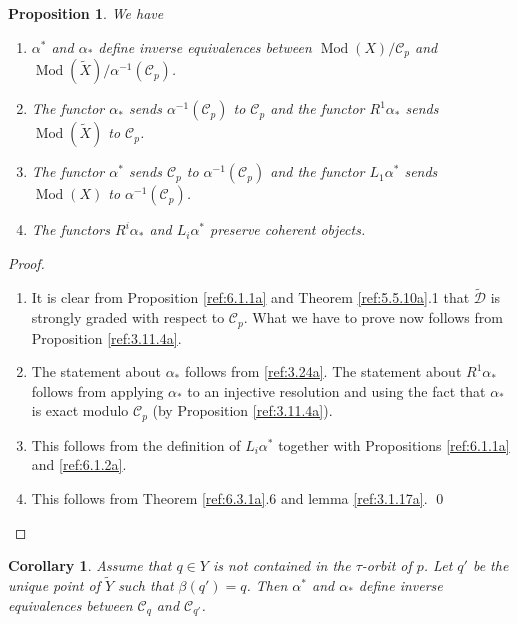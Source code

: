 \documentclass{amsproc}
\def\Cscr{{\mathcal C}}
\def\Dscr{{\mathcal D}}
\def\Qch{\operatorname {Mod}}
\newtheorem{propositions}[lemmas]{Proposition}
\newtheorem{corollarys}[lemmas]{Corollary}
\theoremstyle{definition}
\theoremstyle{remark}
\numberwithin{equation}{section}
\numberwithin{table}{section}
\numberwithin{figure}{section}
\begin{document}
\begin{propositions} 
\label{ref:6.5.2a}
We have 
\begin{enumerate}
\item $\alpha^\ast$ and $\alpha_\ast$ define inverse equivalences
  between $\Qch(X)/\Cscr_p$ and
  $\Qch({\tilde{X}})/\alpha^{-1}(\Cscr_p)$. 
\item The functor $\alpha_\ast$ sends $\alpha^{-1}(\Cscr_p)$ to
$\Cscr_p$ and the functor
$R^1\alpha_\ast$ sends $\Qch({\tilde{X}})$ to $\Cscr_p$. 
\item The functor $\alpha^\ast$ sends $\Cscr_p$ to
$\alpha^{-1}(\Cscr_p)$ and the functor $L_1\alpha^\ast$ sends $\Qch(X)$
to $\alpha^{-1}(\Cscr_p)$. 
\item The functors $R^i\alpha_\ast$ and $L_i\alpha^\ast$ preserve
coherent objects.
\end{enumerate}
\end{propositions}
\begin{proof}
\begin{enumerate}
\item
It is clear from Proposition \ref{ref:6.1.1a} and  Theorem
\ref{ref:5.5.10a}.1 that $\tilde{\Dscr}$ is strongly graded with respect
to $\Cscr_p$. What we have to prove now follows from Proposition
\ref{ref:3.11.4a}.
\item
The statement about $\alpha_\ast$ follows from \eqref{ref:3.24a}.
The statement about $R^1\alpha_\ast$ follows from applying $\alpha_\ast$ to
an injective resolution and using the fact that $\alpha_\ast$ is exact
modulo $\Cscr_p$ (by Proposition \ref{ref:3.11.4a}).
\item
This follows from the definition of $L_i\alpha^\ast$ together with
Propositions \ref{ref:6.1.1a} and \ref{ref:6.1.2a}.
\item This follows from Theorem \ref{ref:6.3.1a}.6 and lemma 
\ref{ref:3.1.17a}. 
\qed\end{enumerate}
\def\qed{}\end{proof}
\begin{corollarys} 
\label{ref:6.5.3a}
Assume that $q\in Y$ is not contained in the
  $\tau$-orbit of $p$. Let $q'$ be the unique point of ${\tilde{Y}}$ such that
  $\beta(q')=q$. Then $\alpha^\ast$ and $\alpha_\ast$ define
  inverse equivalences between $\Cscr_q$ and $\Cscr_{q'}$.
\end{corollarys}
\end{document}
